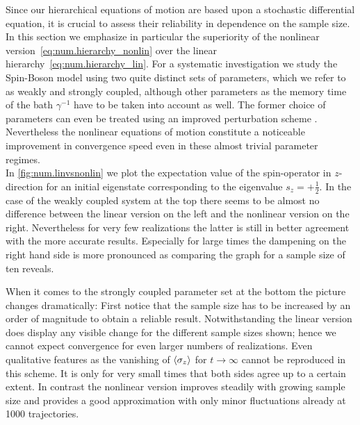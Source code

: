 Since our hierarchical equations of motion are based upon a stochastic differential equation, it is crucial to assess their reliability in dependence on the sample size.
In this section we emphasize in particular the superiority of the nonlinear version~\ref{eq:num.hierarchy_nonlin} over the linear hierarchy~\ref{eq:num.hierarchy_lin}.
For a systematic investigation we study the Spin-Boson model using two quite distinct sets of parameters, which we refer to as weakly and strongly coupled, although other parameters as the memory time of the bath $\gamma^{-1}$ have to be taken into account as well.
The former choice of parameters can even be treated using an improved perturbation scheme \cite{GaHuZh10_qubit,HuZh08_qubit}.
Nevertheless the nonlinear equations of motion constitute a noticeable improvement in convergence speed even in these almost trivial parameter regimes.\\

In \autoref{fig:num.linvsnonlin} we plot the expectation value of the spin-operator in $z$-direction for an initial eigenstate corresponding to the eigenvalue $s_z = +\frac{1}{2}$.
In the case of the weakly coupled system at the top there seems to be almost no difference between the linear version on the left and the nonlinear version on the right.
Nevertheless for very few realizations the latter is still in better agreement with the more accurate results.
Especially for large times the dampening on the right hand side is more pronounced as comparing the graph for a sample size of ten reveals.

When it comes to the strongly coupled parameter set at the bottom the picture changes dramatically:
First notice that the sample size has to be increased by an order of magnitude to obtain a reliable result.
Notwithstanding the linear version does display any visible change for the different sample sizes shown; hence we cannot expect convergence for even larger numbers of realizations.
Even qualitative features as the vanishing of $\langle \sigma_z \rangle$ for $t \to \infty$ cannot be reproduced in this scheme.
It is only for very small times that both sides agree up to a certain extent.
In contrast the nonlinear version improves steadily with growing sample size and provides a good approximation with only minor fluctuations already at 1000 trajectories. \\

